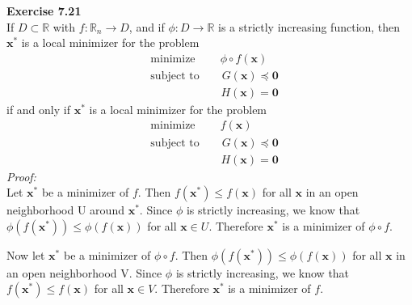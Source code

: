 \documentclass[letterpaper,12pt]{article}
\let\vec\mathbf
\theoremstyle{definition}
\begin{document}
\textbf{Exercise 7.21} \\
If $D \subset \mathbb{R}$ with $f: \mathbb{R}_n \to D$, and if $\phi: D \to \mathbb{R}$ is a strictly increasing function, then $\vec{x}^*$ is a local minimizer for the problem
\begin{align*}
  &\text{minimize} \qquad \ \phi \circ f(\vec{x}) \\
  &\text{subject to} \qquad G(\vec{x}) \preceq \vec{0} \\
  & \ \qquad\qquad\qquad H(\vec{x}) = \vec{0}
\end{align*}
if and only if $\vec{x}^*$ is a local minimizer for the problem
\begin{align*}
  &\text{minimize} \qquad \ f(\vec{x}) \\
  &\text{subject to} \qquad G(\vec{x}) \preceq \vec{0} \\
  & \ \qquad\qquad\qquad H(\vec{x}) = \vec{0}
\end{align*}
\textit{Proof:} \\
Let $\vec{x}^*$ be a minimizer of $f$. Then $f(\vec{x}^*) \leq f(\vec{x})$ for all $\vec{x}$ in an open neighborhood U around $\vec{x}^*$. Since $\phi$ is strictly increasing, we know that $\phi(f(\vec{x}^*)) \leq \phi(f(\vec{x}))$ for all $\vec{x} \in U$. Therefore $\vec{x}^*$ is a minimizer of $\phi \circ f$.

Now let $\vec{x}^*$ be a minimizer of $\phi \circ f$. Then $\phi(f(\vec{x}^*)) \leq \phi(f(\vec{x}))$ for all $\vec{x}$ in an open neighborhood V. Since $\phi$ is strictly increasing, we know that $f(\vec{x}^*) \leq f(\vec{x})$ for all $\vec{x} \in V$. Therefore $\vec{x}^*$ is a minimizer of $f$.
\end{document}

